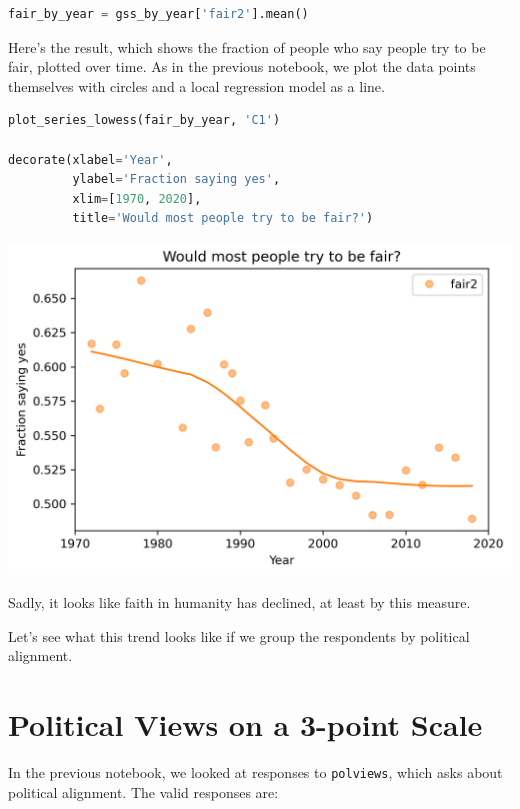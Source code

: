 \begin{lstlisting}[language=Python,style=source]
fair_by_year = gss_by_year['fair2'].mean()
\end{lstlisting}

Here's the result, which shows the fraction of people who say people try
to be fair, plotted over time. As in the previous notebook, we plot the
data points themselves with circles and a local regression model as a
line.

\begin{lstlisting}[language=Python,style=source]
plot_series_lowess(fair_by_year, 'C1')

decorate(xlabel='Year',
         ylabel='Fraction saying yes',
         xlim=[1970, 2020],
         title='Would most people try to be fair?')
\end{lstlisting}

\begin{center}
\includegraphics[scale=0.75]{03_outlook_files/03_outlook_32_0.png}
\end{center}

Sadly, it looks like faith in humanity has declined, at least by this
measure.

Let's see what this trend looks like if we group the respondents by
political alignment.

\hypertarget{political-views-on-a-3-point-scale}{%
\section{Political Views on a 3-point
Scale}\label{political-views-on-a-3-point-scale}}

In the previous notebook, we looked at responses to
\passthrough{\lstinline!polviews!}, which asks about political
alignment. The valid responses are:


